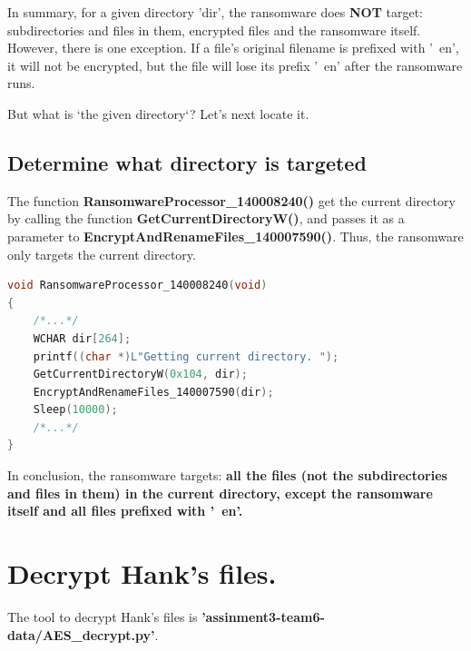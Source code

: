 \documentclass[11pt]{article}
\begin{document}
In summary, for a given directory 'dir', the ransomware does \textbf{NOT} target: subdirectories and files in them, encrypted files and the ransomware itself. However, there is one exception. If a file's original filename is prefixed with '~en', it will not be encrypted, but the file will lose its prefix '~en' after the ransomware runs.

But what is `the given directory`? Let's next locate it.

\subsection{Determine what directory is targeted}
The function \textbf{RansomwareProcessor\_140008240()} get the current directory by calling the function \textbf{GetCurrentDirectoryW()}, and passes it as a parameter to \textbf{EncryptAndRenameFiles\_140007590()}. Thus, the ransomware only targets the current directory.
\begin{lstlisting}[language=c++, caption=Part of RansomwareProcessor\_140008240]
void RansomwareProcessor_140008240(void)
{
    /*...*/
    WCHAR dir[264];
    printf((char *)L"Getting current directory. ");
    GetCurrentDirectoryW(0x104, dir);
    EncryptAndRenameFiles_140007590(dir);
    Sleep(10000);
    /*...*/
}
\end{lstlisting}

In conclusion, the ransomware targets: \textbf{all the files (not the subdirectories and files in them) in the current directory, except the ransomware itself and all files prefixed with '~en'.}

\section{Decrypt Hank's files.}
The tool to decrypt Hank's files is \textbf{'assinment3-team6-data/AES\_decrypt.py'}.



\end{document}

